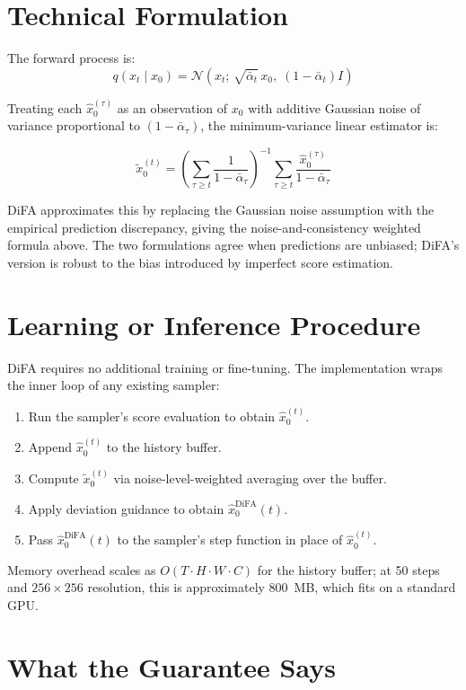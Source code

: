 \documentclass[10pt,twocolumn]{article}
\begin{document}
\section{Technical Formulation}

The forward process is:
\[
  q(x_t \mid x_0) = \mathcal{N}\!\left(x_t;\,
    \sqrt{\bar\alpha_t}\,x_0,\; (1-\bar\alpha_t)I\right)
\]

Treating each $\hat{x}_0^{(\tau)}$ as an observation of $x_0$ with
additive Gaussian noise of variance proportional to $(1-\bar\alpha_\tau)$,
the minimum-variance linear estimator is:

\[
  \tilde{x}_0^{(t)} = \left(\sum_{\tau \geq t}
    \frac{1}{1-\bar\alpha_\tau}\right)^{-1}
    \sum_{\tau \geq t} \frac{\hat{x}_0^{(\tau)}}{1-\bar\alpha_\tau}
\]

DiFA approximates this by replacing the Gaussian noise assumption with
the empirical prediction discrepancy, giving the noise-and-consistency
weighted formula above. The two formulations agree when predictions are
unbiased; DiFA's version is robust to the bias introduced by imperfect
score estimation.

\section{Learning or Inference Procedure}

DiFA requires no additional training or fine-tuning. The implementation
wraps the inner loop of any existing sampler:

\begin{enumerate}[itemsep=2pt,parsep=0pt]
  \item Run the sampler's score evaluation to obtain $\hat{x}_0^{(t)}$.
  \item Append $\hat{x}_0^{(t)}$ to the history buffer.
  \item Compute $\tilde{x}_0^{(t)}$ via noise-level-weighted averaging
    over the buffer.
  \item Apply deviation guidance to obtain $\hat{x}_0^\text{DiFA}(t)$.
  \item Pass $\hat{x}_0^\text{DiFA}(t)$ to the sampler's step function
    in place of $\hat{x}_0^{(t)}$.
\end{enumerate}

Memory overhead scales as $O(T \cdot H \cdot W \cdot C)$ for the history
buffer; at 50 steps and $256 \times 256$ resolution, this is approximately
800~MB, which fits on a standard GPU.

\section{What the Guarantee Says}
\end{document}
